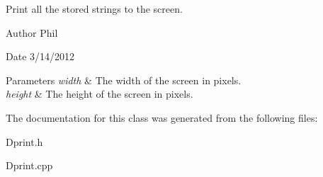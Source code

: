 Print all the stored strings to the screen. 

\begin{DoxyAuthor}{Author}
Phil 
\end{DoxyAuthor}
\begin{DoxyDate}{Date}
3/14/2012
\end{DoxyDate}

\begin{DoxyParams}{Parameters}
{\em width} & The width of the screen in pixels. \\
\hline
{\em height} & The height of the screen in pixels. \\
\hline
\end{DoxyParams}


The documentation for this class was generated from the following files\-:\begin{DoxyCompactItemize}
\item 
Dprint.\-h\item 
Dprint.\-cpp\end{DoxyCompactItemize}
